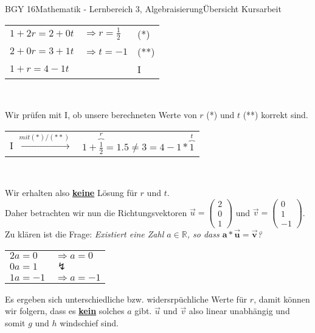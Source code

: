 \documentclass[oneside,openany,headings=optiontotoc,11pt,numbers=noenddot]{scrreprt}
\begin{document}
\begin{worksheet}{BGY 16}{Mathematik - Lernbereich 3, Algebraisierung}{Übersicht Kursarbeit}
\begin{framed}
			\begin{tabularx}{\textwidth}{lll}
				\(1 +2r = 2 +0t\) & \(\Rightarrow r = \frac{1}{2}\) & (*)\\
				\(2 + 0r = 3 + 1t\) & \(\Rightarrow t = -1\) & (**)\\
				\(1 +r = 4 -1t\) & & I\\
			\end{tabularx}\\
			\par\noindent
			Wir prüfen mit I, ob unsere berechneten Werte von \(r\) (*) und \(t\) (**) korrekt sind.\\
			\par\noindent
			\begin{tabularx}{\textwidth}{lX}
				I \(\xrightarrow{mit (*)/(**)}\) & \(1 + \overbrace{\frac{1}{2}}^{r} = 1.5 \neq  3 = 4 - 1*\overbrace{1}^{t}\)				
			\end{tabularx}\\
			\par\noindent
			Wir erhalten also \underline{\textbf{keine}} Lösung für \(r\) und \(t\).\\
			Daher betrachten wir nun die Richtungsvektoren \(\vec{u} = \left(\begin{array}{c}2\\0\\1\end{array}\right)\) und \(\vec{v} = \left(\begin{array}{c}0\\1\\-1\end{array}\right)\).\\
			Zu klären ist die Frage: \textit{Existiert eine Zahl \(a\in\mathbb{R}\), so dass \(\mathbf{a*\vec{u} = \vec{v}}\)?}
			\begin{tabularx}{\textwidth}{ll}
				\(2a = 0\) & \(\Rightarrow a = 0\)\\
				\(0a = 1\) & \(\lightning\)\\
				\(1a = -1\) & \(\Rightarrow a = -1\)
			\end{tabularx}
			Es ergeben sich unterschiedliche bzw. widersrpüchliche Werte für \(r\), damit können wir folgern, dass es \underline{\textbf{kein}} solches \(a\) gibt. \(\vec{u}\) und \(\vec{v}\) also linear \color{blue}unabhängig\normalcolor{} und somit \(g\) und \(h\) \color{red}windschief\normalcolor{} sind.\\
		\end{framed}
		\begin{framed}

\end{framed}
\end{worksheet}
\end{document}
